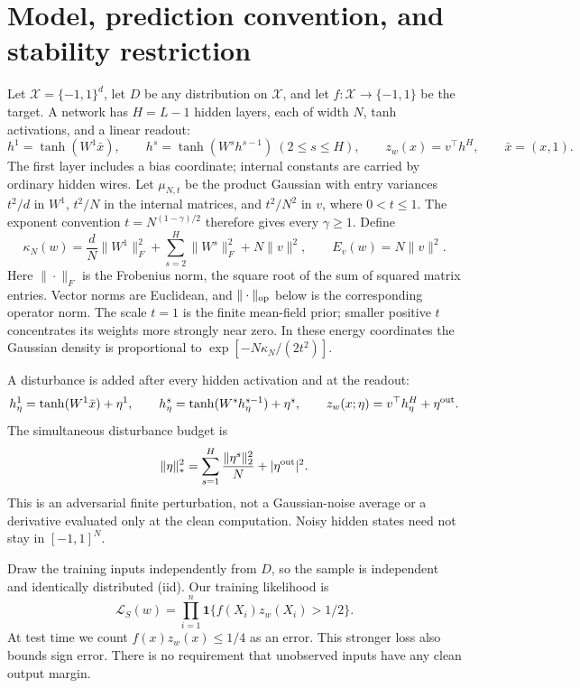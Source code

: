 \section{Model, prediction convention, and stability restriction}
\label{sec:theory-model}

Let $\mathcal X=\{-1,1\}^d$, let $D$ be any distribution on $\mathcal X$,
and let $f:\mathcal X\to\{-1,1\}$ be the target. A network has $H=L-1$
hidden layers, each of width $N$, tanh activations, and a linear readout:
\[
 h^1=\tanh(W^1\bar x),\qquad
 h^s=\tanh(W^s h^{s-1})\ (2\le s\le H),\qquad
 z_w(x)=v^\top h^H,
 \qquad \bar x=(x,1).
\]
The first layer includes a bias coordinate; internal constants are carried
by ordinary hidden wires. Let $\mu_{N,t}$ be the product Gaussian with entry
variances $t^2/d$ in $W^1$, $t^2/N$ in the internal matrices, and $t^2/N^2$
in $v$, where $0<t\le1$. The exponent convention
$t=N^{(1-\gamma)/2}$ therefore gives every $\gamma\ge1$. Define
\[
 \kappa_N(w)=\frac dN\|W^1\|_F^2+
           \sum_{s=2}^H\|W^s\|_F^2+N\|v\|^2,
 \qquad E_v(w)=N\|v\|^2.
\]
Here $\|\cdot\|_F$ is the Frobenius norm, the square root of the sum of
squared matrix entries. Vector norms are Euclidean, and
$\|\cdot\|_{\rm op}$ below is the corresponding operator norm.
The scale $t=1$ is the finite mean-field prior;
smaller positive $t$ concentrates its weights more strongly near zero.
In these energy coordinates the Gaussian density is proportional to
$\exp[-N\kappa_N/(2t^2)]$.

A disturbance is added after every hidden activation and at the readout:
\[
 h^1_\eta=\tanh(W^1\bar x)+\eta^1,\qquad
 h^s_\eta=\tanh(W^s h^{s-1}_\eta)+\eta^s,\qquad
 z_w(x;\eta)=v^\top h^H_\eta+\eta^{\rm out}.
\]
The simultaneous disturbance budget is
\begin{equation}\label{eq:standalone-noise}
 \|\eta\|_*^2=\sum_{s=1}^H\frac{\|\eta^s\|_2^2}{N}
                       +|\eta^{\rm out}|^2.
\end{equation}
This is an adversarial finite perturbation, not a Gaussian-noise average or
a derivative evaluated only at the clean computation. Noisy hidden states
need not stay in $[-1,1]^N$.

Draw the training inputs independently from $D$, so the sample is
independent and identically distributed (iid). Our training likelihood is
\begin{equation}\label{eq:standalone-likelihood}
 \mathcal L_S(w)=\prod_{i=1}^n
       \mathbf1\{f(X_i)z_w(X_i)>1/2\}.
\end{equation}
At test time we count $f(x)z_w(x)\le1/4$ as an error. This stronger loss
also bounds sign error. There is no requirement that unobserved inputs have
any clean output margin.

